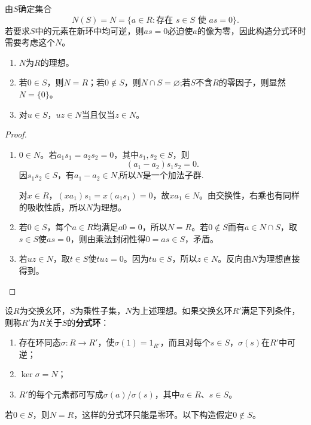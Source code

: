 由$S$确定集合
\[
N(S)=N=\{a\in R:\text{存在 }s\in S\text{ 使 }as=0\}.
\]
若要求$S$中的元素在新环中均可逆，则$as=0$必迫使$a$的像为零，因此构造分式环时需要考虑这个$N$。

\begin{lemma}
\begin{enumerate}
\item $N$为$R$的理想。
\item 若$0\in S$，则$N=R$；若$0\notin S$，则$N\cap S=\varnothing$;若$S$不含$R$的零因子，则显然$N=\{0\}$。
\item 对$u\in S$，$uz\in N$当且仅当$z\in N$。
\end{enumerate}
\end{lemma}
\begin{proof}
\begin{enumerate}
\item $0\in N$。若$a_1s_1=a_2s_2=0$，其中$s_1,s_2\in S$，则
\[
(a_1-a_2)s_1s_2=0.
\]
因$s_1s_2\in S$，有$a_1-a_2\in N$,所以$N$是一个加法子群.

对$x\in R$，$(xa_1)s_1=x(a_1s_1)=0$，故$xa_1\in N$。由交换性，右乘也有同样的吸收性质，所以$N$为理想。
\item 若$0\in S$，每个$a\in R$均满足$a0=0$，所以$N=R$。若$0\notin S$而有$a\in N\cap S$，取$s\in S$使$as=0$，则由乘法封闭性得$0=as\in S$，矛盾。
\item 若$uz\in N$，取$t\in S$使$tuz=0$。因为$tu\in S$，所以$z\in N$。反向由$N$为理想直接得到。
\end{enumerate}
\end{proof}

\begin{definition}
设$R$为交换幺环，$S$为乘性子集，$N$为上述理想。如果交换幺环$R'$满足下列条件，则称$R'$为$R$关于$S$的\textbf{分式环}：
\begin{enumerate}
\item 存在环同态$\sigma:R\to R'$，使$\sigma(1)=1_{R'}$，而且对每个$s\in S$，$\sigma(s)$在$R'$中可逆；
\item $\ker\sigma=N$；
\item $R'$的每个元素都可写成$\sigma(a)/\sigma(s)$，其中$a\in R$、$s\in S$。
\end{enumerate}
\end{definition}

若$0\in S$，则$N=R$，这样的分式环只能是零环。以下构造假定$0\notin S$。

